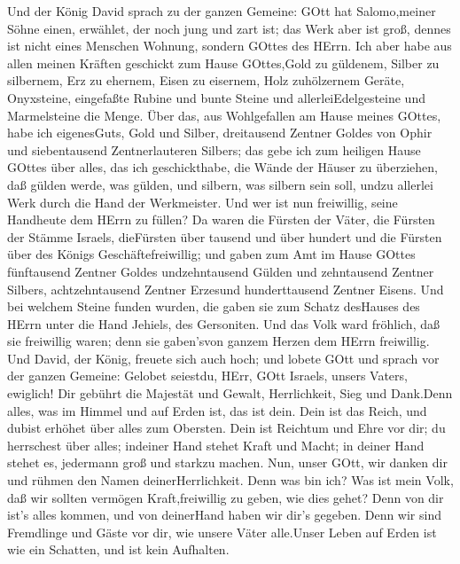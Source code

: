  Und der König David sprach zu der ganzen Gemeine: GOtt hat
Salomo,meiner Söhne einen, erwählet, der noch jung und zart ist; das
Werk aber ist groß, dennes ist nicht eines Menschen Wohnung, sondern
GOttes des HErrn.  Ich aber habe aus allen meinen Kräften
geschickt zum Hause GOttes,Gold zu güldenem, Silber zu silbernem, Erz zu
ehernem, Eisen zu eisernem, Holz zuhölzernem Geräte, Onyxsteine,
eingefaßte Rubine und bunte Steine und allerleiEdelgesteine und
Marmelsteine die Menge.  Über das, aus Wohlgefallen am Hause
meines GOttes, habe ich eigenesGuts, Gold und Silber, 
dreitausend Zentner Goldes von Ophir und siebentausend Zentnerlauteren
Silbers; das gebe ich zum heiligen Hause GOttes über alles, das ich
geschickthabe, die Wände der Häuser zu überziehen,  daß
gülden werde, was gülden, und silbern, was silbern sein soll, undzu
allerlei Werk durch die Hand der Werkmeister. Und wer ist nun
freiwillig, seine Handheute dem HErrn zu füllen?  Da waren
die Fürsten der Väter, die Fürsten der Stämme Israels, dieFürsten über
tausend und über hundert und die Fürsten über des Königs
Geschäftefreiwillig;  und gaben zum Amt im Hause GOttes
fünftausend Zentner Goldes undzehntausend Gülden und zehntausend Zentner
Silbers, achtzehntausend Zentner Erzesund hunderttausend Zentner Eisens.
 Und bei welchem Steine funden wurden, die gaben sie zum
Schatz desHauses des HErrn unter die Hand Jehiels, des Gersoniten.
 Und das Volk ward fröhlich, daß sie freiwillig waren; denn
sie gaben'svon ganzem Herzen dem HErrn freiwillig. Und David, der König,
freuete sich auch hoch;  und lobete GOtt und sprach vor der
ganzen Gemeine: Gelobet seiestdu, HErr, GOtt Israels, unsers Vaters,
ewiglich!  Dir gebührt die Majestät und Gewalt,
Herrlichkeit, Sieg und Dank.Denn alles, was im Himmel und auf Erden ist,
das ist dein. Dein ist das Reich, und dubist erhöhet über alles zum
Obersten.  Dein ist Reichtum und Ehre vor dir; du
herrschest über alles; indeiner Hand stehet Kraft und Macht; in deiner
Hand stehet es, jedermann groß und starkzu machen.  Nun,
unser GOtt, wir danken dir und rühmen den Namen deinerHerrlichkeit.
 Denn was bin ich? Was ist mein Volk, daß wir sollten
vermögen Kraft,freiwillig zu geben, wie dies gehet? Denn von dir ist's
alles kommen, und von deinerHand haben wir dir's gegeben. 
Denn wir sind Fremdlinge und Gäste vor dir, wie unsere Väter alle.Unser
Leben auf Erden ist wie ein Schatten, und ist kein Aufhalten.
